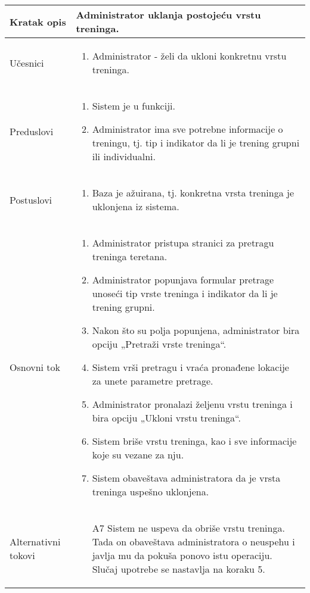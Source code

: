 \documentclass[../main.tex]{subfiles}
\begin{document}
\begin{longtable}{| p{} | p{} |} 

\hline
    Kratak opis &  Administrator uklanja postojeću vrstu treninga.\\ 
\hline    
    Učesnici & 
    	\begin{enumerate}
        \item Administrator - želi da ukloni konkretnu vrstu treninga.
     \end{enumerate}\\
\hline
   Preduslovi & \begin{enumerate}
       \item Sistem je u funkciji.
       \item Administrator ima sve potrebne informacije o treningu, tj. tip i indikator da li je trening grupni ili individualni.
   \end{enumerate}\\
\hline  
    Postuslovi & \begin{enumerate}
        \item Baza je ažuirana, tj. konkretna vrsta treninga je uklonjena iz sistema.
    \end{enumerate}\\
\hline
    Osnovni tok & \begin{enumerate}
        \item Administrator pristupa stranici za pretragu treninga teretana.
        \item Administrator popunjava formular pretrage unoseći tip vrste treninga i indikator da li je trening grupni.
        \item Nakon što su polja popunjena, administrator bira opciju „Pretraži vrste treninga“.
        \item Sistem vrši pretragu i vraća pronađene lokacije za unete parametre pretrage.
        \item Administrator pronalazi željenu vrstu treninga i bira opciju „Ukloni vrstu treninga“.
        \item Sistem briše vrstu treninga, kao i sve informacije koje su vezane za nju.
        \item Sistem obaveštava administratora da je vrsta treninga uspešno uklonjena.
    \end{enumerate}\\
\hline
    Alternativni tokovi & \begin{itemize}
        \item[A7]  Sistem ne uspeva da obriše vrstu treninga. Tada on obaveštava administratora o neuspehu i javlja mu da pokuša ponovo istu operaciju. Slučaj upotrebe se nastavlja na koraku 5.


\end{itemize}
\end{longtable}
\end{document}
